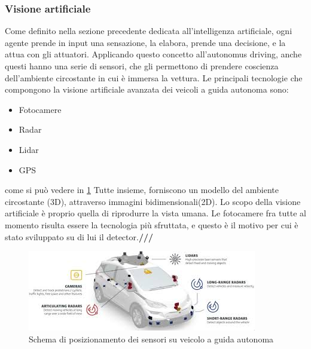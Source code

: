 \documentclass[14pt]{extarticle}
\begin{document}

\subsubsection{Visione artificiale}
Come definito nella sezione precedente dedicata all'intelligenza artificiale, ogni agente prende in input una sensazione, la elabora, prende una decisione, e la attua con gli attuatori. Applicando questo concetto all'autonomus driving, anche questi hanno una serie di sensori, che gli permettono di prendere coscienza dell'ambiente circostante in cui è immersa la vettura.
Le principali tecnologie che compongono la visione artificiale avanzata dei veicoli a guida autonoma sono\cite{das2018risk}:
\begin{itemize}
\item Fotocamere
\item Radar
\item Lidar
\item GPS
\end{itemize}
 come si può vedere in \ref{fig:maga}
Tutte insieme, forniscono un modello del ambiente circostante (3D),  attraverso immagini bidimensionali(2D).
Lo scopo della visione artificiale è proprio quella di riprodurre la vista umana.\cite{wiki:visart}
Le fotocamere fra tutte al momento risulta essere la tecnologia più sfruttata, e questo è il motivo per cui è stato sviluppato su di lui il detector.\textbf{///}
\begin{figure}
\centering
\includegraphics[scale=0.8]{maga.jpeg}
\caption{Schema di posizionamento dei sensori su veicolo a guida autonoma}
\label{fig:maga}
\end{figure}
\end{document}
